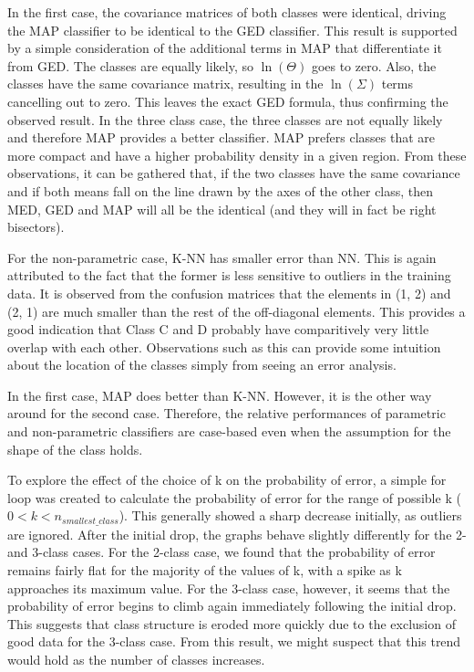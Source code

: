 In the first case, the covariance matrices of both classes were identical,
driving the MAP classifier to be identical to the GED classifier.  This result
is supported by a simple consideration of the additional terms in MAP that 
differentiate it from GED.  The classes are equally likely, so $\ln(\Theta)$
goes to zero.  Also, the classes have the same covariance matrix, resulting in the
$\ln(\Sigma)$ terms cancelling out to zero.  This leaves the exact GED
formula, thus confirming the observed result.  In the three class case, the three
classes are not equally likely and therefore MAP provides a better classifier. 
MAP prefers classes that are more compact and have a higher probability density
in a given region. From these observations, it can be gathered that, if the two
classes have the same covariance and if both means fall on the line drawn by
the  axes of the other class, then MED, GED and MAP will all be the identical 
(and they will in fact be right bisectors).

For the non-parametric case, K-NN has smaller error than NN. This is again
attributed to the fact that the former is less sensitive to outliers in the 
training data. It is observed from the confusion matrices that the elements in
(1, 2) and (2, 1) are much smaller than the rest of the off-diagonal elements. 
This provides a good indication that Class C and D probably have comparitively 
very little overlap with each other.  Observations such as this can provide
some intuition about the location of the classes simply from seeing an error analysis.

In the first case, MAP does better than K-NN. However, it is the other way
around for the second case. Therefore, the relative performances of parametric 
and non-parametric classifiers are case-based even when the assumption for the 
shape of the class holds.

To explore the effect of the choice of k on the probability of error, a simple 
for loop was created to calculate the probability of error for the range 
of possible k ($0 < k < n_{smallest\_class}$).  This generally
showed a sharp decrease initially, as outliers are ignored.  After the initial drop, 
the graphs behave slightly differently for the 2- and 3-class cases.  For the 
2-class case, we found that the probability of error remains fairly flat for
the majority of the values of k, with a spike as k approaches its maximum
value. For the 3-class case, however, it seems that the probability of error 
begins to climb again immediately following the initial drop.  This suggests 
that class structure is eroded more quickly due to the exclusion of good data 
for the 3-class case.  From this result, we might suspect that this trend would
hold as the number of classes increases.
